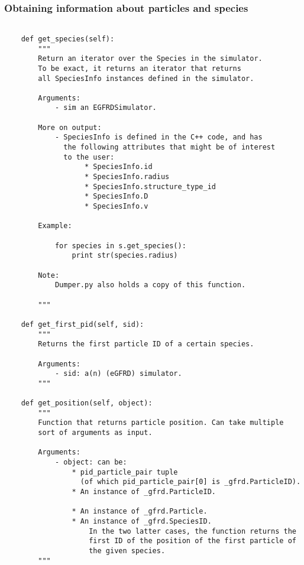 \documentclass[a4paper,10pt]{article}
\begin{document}
\subsubsection{Obtaining information about particles and species}

\begin{verbatim}

    def get_species(self):
        """
        Return an iterator over the Species in the simulator. 
        To be exact, it returns an iterator that returns 
        all SpeciesInfo instances defined in the simulator.
        
        Arguments: 
            - sim an EGFRDSimulator. 

        More on output:
            - SpeciesInfo is defined in the C++ code, and has
              the following attributes that might be of interest
              to the user:
                   * SpeciesInfo.id
                   * SpeciesInfo.radius
                   * SpeciesInfo.structure_type_id
                   * SpeciesInfo.D
                   * SpeciesInfo.v
                
        Example:

            for species in s.get_species():
                print str(species.radius)

        Note:
            Dumper.py also holds a copy of this function.        

        """

    def get_first_pid(self, sid):
        """
        Returns the first particle ID of a certain species.

        Arguments:
            - sid: a(n) (eGFRD) simulator.
        """

    def get_position(self, object):
        """
        Function that returns particle position. Can take multiple
        sort of arguments as input. 

        Arguments:
            - object: can be:
                * pid_particle_pair tuple 
                  (of which pid_particle_pair[0] is _gfrd.ParticleID).
                * An instance of _gfrd.ParticleID.

                * An instance of _gfrd.Particle.
                * An instance of _gfrd.SpeciesID.
                    In the two latter cases, the function returns the 
                    first ID of the position of the first particle of 
                    the given species.
        """ 
 
\end{verbatim}
\end{document}
